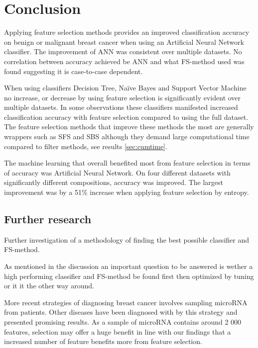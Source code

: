 \chapter{Conclusion}




Applying feature selection methods provides an improved classification accuracy on benign or malignant breast cancer when using an Artificial Neural Network classifier. The improvement of ANN was consistent over multiple datasets. No correlation between accuracy achieved be ANN and what FS-method used was found suggesting it is case-to-case dependent.

When using classifiers Decision Tree, Na\"ive Bayes and Support Vector Machine no increase, or decrease by using feature selection is significantly evident over multiple datasets. In some observations these classifiers manifested increased classification accuracy with feature selection compared to using the full dataset. The feature selection methods that improve these methods the most are generally wrappers such as SFS and SBS although they demand large computational time compared to filter methods, see results \ref{sec:cumtime}.


The machine learning that overall benefited most from feature selection in terms of accuracy was Artificial Neural Network. On four different datasets with significantly different compositions, accuracy was improved. The largest improvement was by a 51\% increase when applying feature selection by entropy.


\section{Further research}

Further investigation of a methodology of finding the best possible classifier and FS-method.

As mentioned in the discussion an important question to be answered is wether a high performing classifier and FS-method be found first then optimized by tuning or it it the other way around.

More recent strategies of diagnosing breast cancer involves sampling microRNA from patients. Other diseases have been diagnosed with by this strategy and presented promising results. As a sample of microRNA contains around 2 000 features, selection may offer a huge benefit in line with our findings that a increased number of feature benefits more from feature selection.
